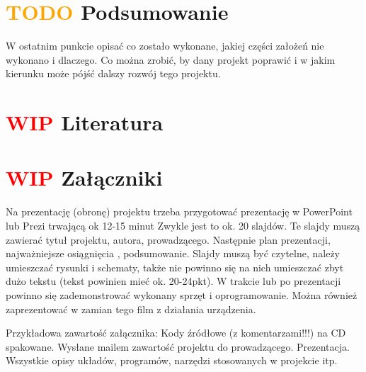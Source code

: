 \documentclass[11pt,titlepage,a4paper]{article}
\begin{document}
\newpage

\section{\textcolor{orange}{TODO} Podsumowanie}

W ostatnim punkcie opisać co zostało wykonane, jakiej części założeń nie wykonano i dlaczego. Co można zrobić, by dany projekt poprawić i w jakim kierunku może pójść dalszy rozwój tego projektu.

\newpage

\section{\textcolor{red}{WIP}  Literatura}

\printbibliography[heading=none]

\newpage

\section{\textcolor{red}{WIP} Załączniki}

Na prezentację (obronę) projektu trzeba przygotować prezentację w PowerPoint lub Prezi trwającą ok 12-15 minut Zwykle jest to ok. 20 slajdów. Te slajdy muszą zawierać tytuł projektu, autora, prowadzącego. Następnie plan prezentacji, najważniejsze osiągnięcia , podsumowanie. Slajdy muszą być czytelne, należy umieszczać rysunki i schematy, także nie powinno się na nich umieszczać zbyt dużo tekstu (tekst powinien mieć ok. 20-24pkt). W trakcie lub po prezentacji powinno się zademonstrować wykonany sprzęt i oprogramowanie. Można również zaprezentować w zamian tego film z działania urządzenia.

Przykładowa zawartość załącznika:
Kody źródłowe (z komentarzami!!!) na CD spakowane.
Wysłane mailem zawartość projektu do prowadzącego.
Prezentacja.
Wszystkie opisy układów, programów, narzędzi stosowanych w projekcie itp.

\newpage

\renewcommand*{\lstlistingname}{Załącznik}
\renewcommand*{\figurename}{Załącznik}
\setcounter{figure}{1}


\end{document}
